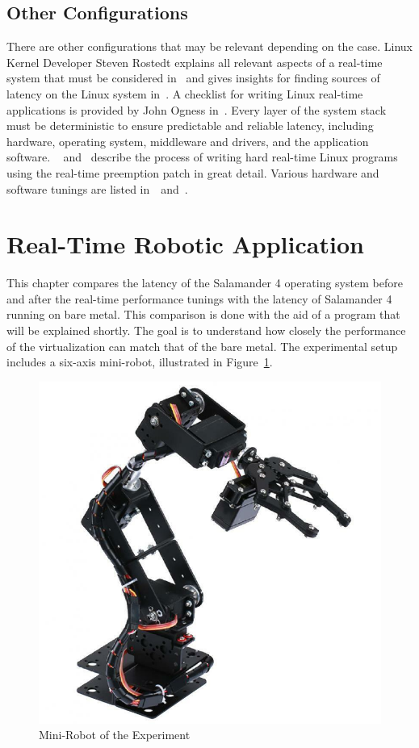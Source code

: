 \documentclass[MMR,Master,english]{style/twbook}
\begin{document}
\subsection{Other Configurations}
There are other configurations that may be relevant depending on the case. Linux Kernel Developer Steven Rostedt explains all relevant aspects of a real-time system that must be considered in~\cite{kernelrecipesKernelRecipes20162016} and gives insights for finding sources of latency on the Linux system in~\cite{thelinuxfoundationFindingSourcesLatency2020}. A checklist for writing Linux real-time applications is provided by John Ogness in~\cite{thelinuxfoundationChecklistWritingLinux2020}. Every layer of the system stack must be deterministic to ensure predictable and reliable latency, including hardware, operating system, middleware and drivers, and the application software. ~\cite{HOWTOBuildRTapplication} and~\cite{RealtimeProgrammingLinux} describe the process of writing hard real-time Linux programs using the real-time preemption patch in great detail. Various hardware and software tunings are listed in~\cite{RealTimePerformanceTuning2022}~and~\cite{KVMQemuVirtualization}.

\clearpage

\section{Real-Time Robotic Application}\label{sec:robotic_application}
This chapter compares the latency of the Salamander 4 operating system before and after the real-time performance tunings with the latency of Salamander 4 running on bare metal. This comparison is done with the aid of a program that will be explained shortly. The goal is to understand how closely the performance of the virtualization can match that of the bare metal. The experimental setup includes a six-axis mini-robot, illustrated in Figure~\ref{fig:mini_robot}.

\begin{figure}[H]
	\centering
	\includegraphics[width=0.3\columnwidth]{img/experiment/mini_robot.jpg}
	\caption[Mini-Robot of the Experiment]{Mini-Robot of the Experiment~\cite{6DFRoboticArm}}
	\label{fig:mini_robot}
\end{figure}
\end{document}
